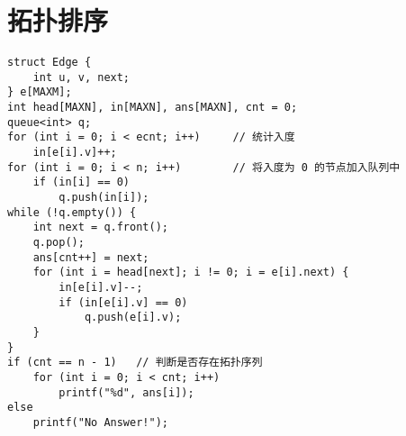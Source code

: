 \section{拓扑排序}
\begin{verbatim}
struct Edge {
    int u, v, next;
} e[MAXM];
int head[MAXN], in[MAXN], ans[MAXN], cnt = 0;
queue<int> q;
for (int i = 0; i < ecnt; i++)     // 统计入度
    in[e[i].v]++;
for (int i = 0; i < n; i++)        // 将入度为 0 的节点加入队列中
    if (in[i] == 0)
        q.push(in[i]);
while (!q.empty()) {
    int next = q.front();
    q.pop();
    ans[cnt++] = next;
    for (int i = head[next]; i != 0; i = e[i].next) {
        in[e[i].v]--;
        if (in[e[i].v] == 0)
            q.push(e[i].v);
    }
}
if (cnt == n - 1)   // 判断是否存在拓扑序列
    for (int i = 0; i < cnt; i++)
        printf("%d", ans[i]);
else
    printf("No Answer!");
\end{verbatim}